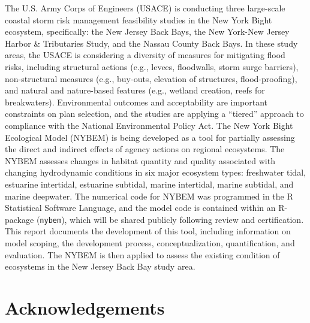 \documentclass[
]{book}
\begin{document}
The U.S. Army Corps of Engineers (USACE) is conducting three large-scale coastal storm risk management feasibility studies in the New York Bight ecosystem, specifically: the New Jersey Back Bays, the New York-New Jersey Harbor \& Tributaries Study, and the Nassau County Back Bays. In these study areas, the USACE is considering a diversity of measures for mitigating flood risks, including structural actions (e.g., levees, floodwalls, storm surge barriers), non-structural measures (e.g., buy-outs, elevation of structures, flood-proofing), and natural and nature-based features (e.g., wetland creation, reefs for breakwaters). Environmental outcomes and acceptability are important constraints on plan selection, and the studies are applying a ``tiered'' approach to compliance with the National Environmental Policy Act. The New York Bight Ecological Model (NYBEM) is being developed as a tool for partially assessing the direct and indirect effects of agency actions on regional ecosystems. The NYBEM assesses changes in habitat quantity and quality associated with changing hydrodynamic conditions in six major ecosystem types: freshwater tidal, estuarine intertidal, estuarine subtidal, marine intertidal, marine subtidal, and marine deepwater. The numerical code for NYBEM was programmed in the R Statistical Software Language, and the model code is contained within an R-package (\texttt{nybem}), which will be shared publicly following review and certification. This report documents the development of this tool, including information on model scoping, the development process, conceptualization, quantification, and evaluation. The NYBEM is then applied to assess the existing condition of ecosystems in the New Jersey Back Bay study area.

\hypertarget{acknowledgements}{%
\section*{Acknowledgements}\label{acknowledgements}}
\end{document}
